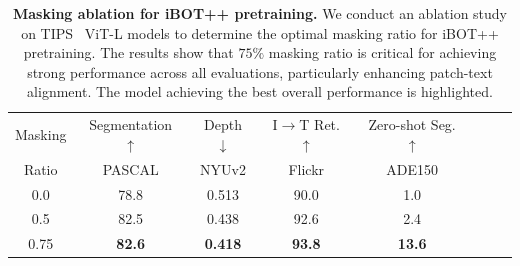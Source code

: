 \begin{table}[t!]


\caption{\small \textbf{Masking ablation for iBOT++ pretraining.} We conduct an ablation study on TIPS~\citep{tips_paper} ViT-L models to determine the optimal masking ratio for iBOT++ pretraining. 
The results show that $75\%$ masking ratio is critical for achieving strong performance across all evaluations, particularly enhancing patch-text alignment.
The model achieving the best overall performance is highlighted.}
\vspace{-2mm}
\scriptsize
\setlength{\tabcolsep}{4pt} %
\centering
{
\begin{tabular}{c c c c c c c c}
\small Masking & Segmentation $\uparrow$ & Depth $\downarrow$ & I$\rightarrow$T Ret. $\uparrow$ &  Zero-shot Seg. $\uparrow$ \\
Ratio & PASCAL & NYUv2 & Flickr & ADE150 \\
\midrule
0.0 & 78.8 & 0.513 & 90.0 & 1.0 \\
0.5 & 82.5 & 0.438 & 92.6  & 2.4 \\
0.75 & \textbf{82.6} & \textbf{0.418} & \textbf{93.8} & \textbf{13.6} \\
\end{tabular}
}
\label{tab:masking}
\end{table}
